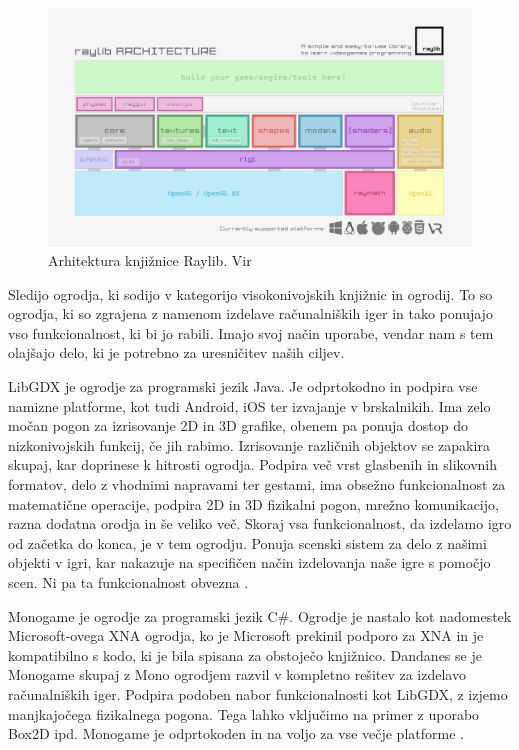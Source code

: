 \documentclass[12pt,a4paper,twoside]{book}
\begin{document}
\begin{figure}[h]
	\centering
	\includegraphics[width=12cm]{raylib_architecture}
	\caption{Arhitektura knjižnice Raylib. Vir \cite{raylib}}
	\label{slika:raylib}
\end{figure}

Sledijo ogrodja, ki sodijo v kategorijo visokonivojskih knjižnic in ogrodij. To so ogrodja, ki so zgrajena z namenom izdelave računalniških iger in tako ponujajo vso funkcionalnost, ki bi jo rabili. Imajo svoj način uporabe, vendar nam s tem olajšajo delo, ki je potrebno za uresničitev naših ciljev.

LibGDX je ogrodje za programski jezik Java. Je odprtokodno in podpira vse namizne platforme, kot tudi Android, iOS ter izvajanje v brskalnikih. Ima zelo močan pogon za izrisovanje 2D in 3D grafike, obenem pa ponuja dostop do nizkonivojskih funkcij, če jih rabimo. Izrisovanje različnih objektov se zapakira skupaj, kar doprinese k hitrosti ogrodja. Podpira več vrst glasbenih in slikovnih formatov, delo z vhodnimi napravami ter gestami, ima obsežno funkcionalnost za matematične operacije, podpira 2D in 3D fizikalni pogon, mrežno komunikacijo, razna dodatna orodja in še veliko več. Skoraj vsa funkcionalnost, da izdelamo igro od začetka do konca, je v tem ogrodju. Ponuja scenski sistem za delo z našimi objekti v igri, kar nakazuje na specifičen način izdelovanja naše igre s pomočjo scen. Ni pa ta funkcionalnost obvezna \cite{libgdx}.

Monogame je ogrodje za programski jezik C\#. Ogrodje je nastalo kot nadomestek Microsoft-ovega XNA ogrodja, ko je Microsoft prekinil podporo za XNA in je kompatibilno s kodo, ki je bila spisana za obstoječo knjižnico. Dandanes se je Monogame skupaj z Mono ogrodjem razvil v kompletno rešitev za izdelavo računalniških iger. Podpira podoben nabor funkcionalnosti kot LibGDX, z izjemo manjkajočega fizikalnega pogona. Tega lahko vključimo na primer z uporabo Box2D ipd. Monogame je odprtokoden in na voljo za vse večje platforme \cite{monogame}.
\end{document}
